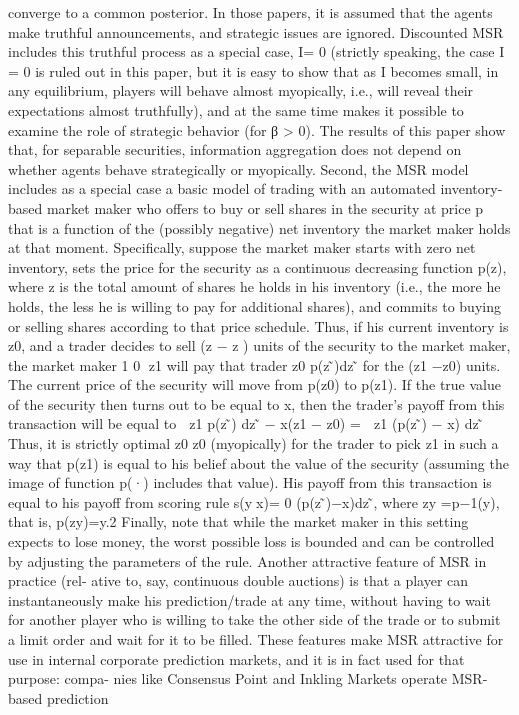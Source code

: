 {converge to a common posterior. In those papers, it is assumed that the agents make truthful announcements, and strategic issues are ignored. Discounted MSR includes this truthful process as a special case, I= 0 (strictly speaking, the case I = 0 is ruled out in this paper, but it is easy to show that as I becomes small, in any equilibrium, players will behave almost myopically, i.e., will reveal their expectations almost truthfully), and at the same time makes it possible to examine the role of strategic behavior (for β > 0). The results of this paper show that, for separable securities, information aggregation does not depend on whether agents behave strategically or myopically.
Second, the MSR model includes as a special case a basic model of trading
with an automated inventory-based market maker who offers to buy or sell
shares in the security at price p that is a function of the (possibly negative) net
inventory the market maker holds at that moment. Specifically, suppose the
market maker starts with zero net inventory, sets the price for the security as
a continuous decreasing function p(z), where z is the total amount of shares
he holds in his inventory (i.e., the more he holds, the less he is willing to pay
for additional shares), and commits to buying or selling shares according to
that price schedule. Thus, if his current inventory is z0, and a trader decides
to sell (z − z ) units of the security to the market maker, the market maker 1 0 􏰋z1
will pay that trader z0 p(z ̃)dz ̃ for the (z1 −z0) units. The current price of the security will move from p(z0) to p(z1). If the true value of the security then
turns out to be equal to x, then the trader’s payoff from this transaction will be equal to 􏰋 z1 p(z ̃) dz ̃ − x(z1 − z0) = 􏰋 z1 (p(z ̃) − x) dz ̃􏰷 Thus, it is strictly optimal
z0 z0
(myopically) for the trader to pick z1 in such a way that p(z1) is equal to his
belief about the value of the security (assuming the image of function p(·)
includes that value). His payoff from this transaction is equal to his payoff from
scoring rule s(y􏰸x)= 0 (p(z ̃)−x)dz ̃, where zy =p−1(y), that is, p(zy)=y.2 Finally, note that while the market maker in this setting expects to lose money, the worst possible loss is bounded and can be controlled by adjusting the parameters of the rule. Another attractive feature of MSR in practice (rel- ative to, say, continuous double auctions) is that a player can instantaneously make his prediction/trade at any time, without having to wait for another player who is willing to take the other side of the trade or to submit a limit order and wait for it to be filled. These features make MSR attractive for use in internal corporate prediction markets, and it is in fact used for that purpose: compa- nies like Consensus Point and Inkling Markets operate MSR-based prediction
}
